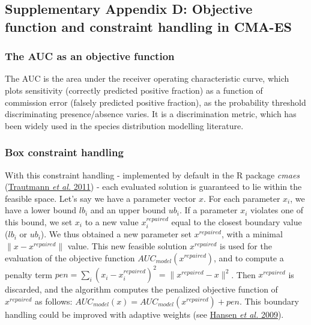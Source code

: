 \newpage

\subsection{Supplementary Appendix D: Objective function and constraint
handling in CMA-ES}\label{chap1:appendixD}





\subsubsection{The AUC as an objective
function}\label{the-auc-as-an-objective-function}

The AUC is the area under the receiver operating characteristic curve,
which plots sensitivity (correctly predicted positive fraction) as a
function of commission error (falsely predicted positive fraction), as
the probability threshold discriminating presence/absence varies. It is
a discrimination metric, which has been widely used in the species
distribution modelling literature.

\subsubsection{Box constraint handling}\label{box-constraint-handling}

With this constraint handling - implemented by default in the R package
\emph{cmaes} (\protect\hyperlink{ref-Trautmann2011}{Trautmann \emph{et
al.} 2011}) - each evaluated solution is guaranteed to lie within the
feasible space. Let's say we have a parameter vector \(x\). For each
parameter \(x_i\), we have a lower bound \(lb_i\) and an upper bound
\(ub_i\). If a parameter \(x_i\) violates one of this bound, we set
\(x_i\) to a new value \(x_i^{repaired}\) equal to the closest boundary
value (\(lb_i\) or \(ub_i\)). We thus obtained a new parameter set
\(x^{repaired}\), with a minimal \(\|x-x^{repaired}\|\) value. This new
feasible solution \(x^{repaired}\) is used for the evaluation of the
objective function \(AUC_{model}(x^{repaired})\), and to compute a
penalty term
\(pen=\sum\limits_{i}(x_i-x_i^{repaired})^2=\|x^{repaired}-x\|^2\). Then
\(x^{repaired}\) is discarded, and the algorithm computes the penalized
objective function of \(x^{repaired}\) as follows:
\(AUC_{model}(x)=AUC_{model}(x^{repaired})+pen\). This boundary handling
could be improved with adaptive weights (see
\protect\hyperlink{ref-Hansen2009}{Hansen \emph{et al.} 2009}).

